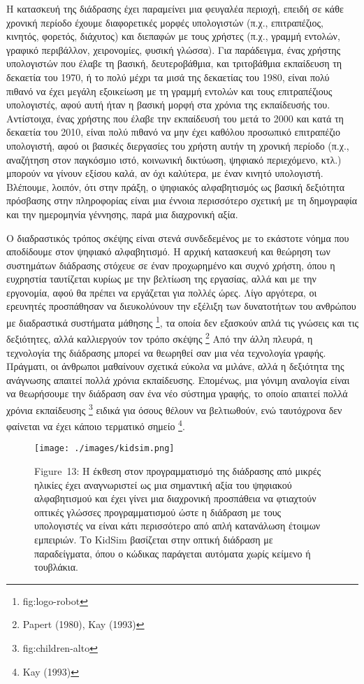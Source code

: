 \documentclass[
]{article}
\begin{document}
Η κατασκευή της διάδρασης έχει παραμείνει μια φευγαλέα περιοχή, επειδή
σε κάθε χρονική περίοδο έχουμε διαφορετικές μορφές υπολογιστών (π.χ.,
επιτραπέζιος, κινητός, φορετός, διάχυτος) και διεπαφών με τους χρήστες
(π.χ., γραμμή εντολών, γραφικό περιβάλλον, χειρονομίες, φυσική γλώσσα).
Για παράδειγμα, ένας χρήστης υπολογιστών που έλαβε τη βασική,
δευτεροβάθμια, και τριτοβάθμια εκπαίδευση τη δεκαετία του 1970, ή το
πολύ μέχρι τα μισά της δεκαετίας του 1980, είναι πολύ πιθανό να έχει
μεγάλη εξοικείωση με τη γραμμή εντολών και τους επιτραπέζιους
υπολογιστές, αφού αυτή ήταν η βασική μορφή στα χρόνια της εκπαίδευσής
του. Αντίστοιχα, ένας χρήστης που έλαβε την εκπαίδευσή του μετά το 2000
και κατά τη δεκαετία του 2010, είναι πολύ πιθανό να μην έχει καθόλου
προσωπικό επιτραπέζιο υπολογιστή, αφού οι βασικές διεργασίες του χρήστη
αυτήν τη χρονική περίοδο (π.χ., αναζήτηση στον παγκόσμιο ιστό, κοινωνική
δικτύωση, ψηφιακό περιεχόμενο, κτλ.) μπορούν να γίνουν εξίσου καλά, αν
όχι καλύτερα, με έναν κινητό υπολογιστή. Βλέπουμε, λοιπόν, ότι στην
πράξη, ο ψηφιακός αλφαβητισμός ως βασική δεξιότητα πρόσβασης στην
πληροφορίας είναι μια έννοια περισσότερο σχετική με τη δημογραφία και
την ημερομηνία γέννησης, παρά μια διαχρονική αξία.

Ο διαδραστικός τρόπος σκέψης είναι στενά συνδεδεμένος με το εκάστοτε
νόημα που αποδίδουμε στον ψηφιακό αλφαβητισμό. Η αρχική κατασκευή και
θεώρηση των συστημάτων διάδρασης στόχευε σε έναν προχωρημένο και συχνό
χρήστη, όπου η ευχρηστία ταυτίζεται κυρίως με την βελτίωση της εργασίας,
αλλά και με την εργονομία, αφού θα πρέπει να εργάζεται για πολλές ώρες.
Λίγο αργότερα, οι ερευνητές προσπάθησαν να διευκολύνουν την εξέλιξη των
δυνατοτήτων του ανθρώπου με διαδραστικά συστήματα μάθησης \footnote{fig:logo-robot},
τα οποία δεν εξασκούν απλά τις γνώσεις και τις δεξιότητες, αλλά
καλλιεργούν τον τρόπο σκέψης \footnote{Papert (1980), Kay (1993)} Από
την άλλη πλευρά, η τεχνολογία της διάδρασης μπορεί να θεωρηθεί σαν μια
νέα τεχνολογία γραφής. Πράγματι, οι άνθρωποι μαθαίνουν σχετικά εύκολα να
μιλάνε, αλλά η δεξιότητα της ανάγνωσης απαιτεί πολλά χρόνια εκπαίδευσης.
Επομένως, μια γόνιμη αναλογία είναι να θεωρήσουμε την διάδραση σαν ένα
νέο σύστημα γραφής, το οποίο απαιτεί πολλά χρόνια εκπαίδευσης
\footnote{fig:children-alto} ειδικά για όσους θέλουν να βελτιωθούν, ενώ
ταυτόχρονα δεν φαίνεται να έχει κάποιο τερματικό σημείο \footnote{Kay
  (1993)}.

\leavevmode{}%
\begin{figure}
\hypertarget{fig:kidsim}{%
\centering
\texttt{[image: ./images/kidsim.png]}
\caption{Figure~13: Η έκθεση στον προγραμματισμό της διάδρασης από
μικρές ηλικίες έχει αναγνωριστεί ως μια σημαντική αξία του ψηφιακού
αλφαβητισμού και έχει γίνει μια διαχρονική προσπάθεια να φτιαχτούν
οπτικές γλώσσες προγραμματισμού ώστε η διάδραση με τους υπολογιστές να
είναι κάτι περισσότερο από απλή κατανάλωση έτοιμων εμπειριών. Το KidSim
βασίζεται στην οπτική διάδραση με παραδείγματα, όπου ο κώδικας παράγεται
αυτόματα χωρίς κείμενο ή τουβλάκια.}\label{fig:kidsim}
}
\end{figure}
\end{document}

